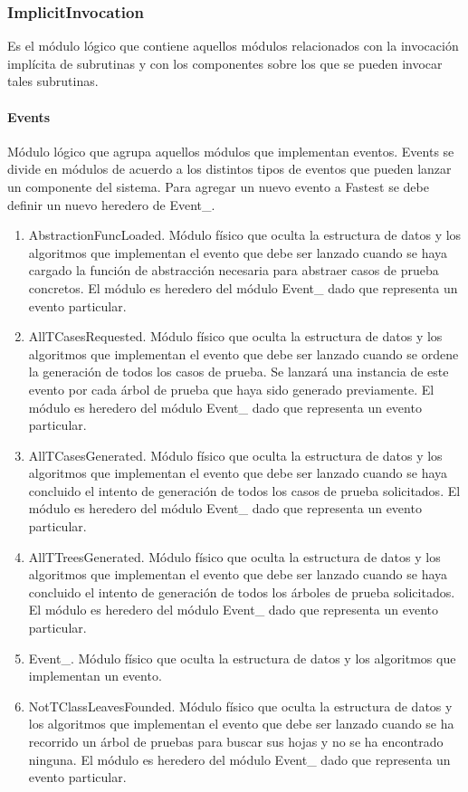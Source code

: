\documentclass[a4paper,10pt]{report}
\begin{document}
			\subsubsection{ImplicitInvocation}
			Es el módulo lógico que contiene aquellos módulos relacionados con la invocación implícita de subrutinas y con los componentes sobre los que se pueden invocar tales subrutinas.
				\paragraph{Events}
				Módulo lógico que agrupa aquellos módulos que implementan eventos. Events se divide en módulos de acuerdo a los distintos tipos de eventos que pueden lanzar un componente del sistema. Para agregar un nuevo evento a Fastest se debe definir un nuevo heredero de Event\_.
					\begin{enumerate}
					\item{AbstractionFuncLoaded. Módulo físico que oculta la estructura de datos y los algoritmos que implementan el evento que debe ser lanzado cuando se haya cargado la función de abstracción necesaria para abstraer casos de prueba concretos. El módulo es heredero del módulo Event\_ dado que representa un evento particular.}
					\item{AllTCasesRequested. Módulo físico que oculta la estructura de datos y los algoritmos que implementan el evento que debe ser lanzado cuando se ordene la generación de todos los casos de prueba. Se lanzará una instancia de este evento por cada árbol de prueba que haya sido generado previamente. El módulo es heredero del módulo Event\_ dado que representa un evento particular.}
					\item{AllTCasesGenerated. Módulo físico que oculta la estructura de datos y los algoritmos que implementan el evento que debe ser lanzado cuando se haya concluido el intento de generación de todos los casos de prueba solicitados. El módulo es heredero del módulo Event\_ dado que representa un evento particular.}
					\item{AllTTreesGenerated. Módulo físico que oculta la estructura de datos y los algoritmos que implementan el evento que debe ser lanzado cuando se haya concluido el intento de generación de todos los árboles de prueba solicitados. El módulo es heredero del módulo Event\_ dado que representa un evento particular.}
					\item{Event\_. Módulo físico que oculta la estructura de datos y los algoritmos que implementan un evento.}
					\item{NotTClassLeavesFounded. Módulo físico que oculta la estructura de datos y los algoritmos que implementan el evento que debe ser lanzado cuando se ha recorrido un árbol de pruebas para buscar sus hojas y no se ha encontrado ninguna. El módulo es heredero del módulo Event\_ dado que representa un evento particular.}	

\end{enumerate}
\end{document}
